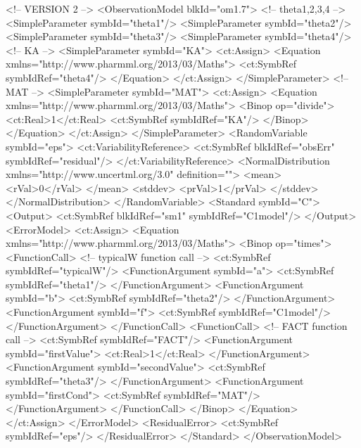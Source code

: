 \documentclass[a4paper,10pt]{article}
\begin{document}
\begin{xmlcode}
<!-- VERSION 2 -->
<ObservationModel blkId="om1.7">
    <!-- theta1,2,3,4 -->
    <SimpleParameter symbId="theta1"/>
    <SimpleParameter symbId="theta2"/>
    <SimpleParameter symbId="theta3"/>
    <SimpleParameter symbId="theta4"/>
    <!-- KA -->
    <SimpleParameter symbId="KA">
        <ct:Assign>
            <Equation xmlns="http://www.pharmml.org/2013/03/Maths">
                <ct:SymbRef symbIdRef="theta4"/>
            </Equation>
        </ct:Assign>
    </SimpleParameter>
    <!-- MAT -->
    <SimpleParameter symbId="MAT">
        <ct:Assign>
            <Equation xmlns="http://www.pharmml.org/2013/03/Maths">
                <Binop op="divide">
                    <ct:Real>1</ct:Real>
                    <ct:SymbRef symbIdRef="KA"/>
                </Binop>
            </Equation>
        </ct:Assign>
    </SimpleParameter>
    <RandomVariable symbId="eps">
        <ct:VariabilityReference>
            <ct:SymbRef blkIdRef="obsErr" symbIdRef="residual"/>
        </ct:VariabilityReference>
        <NormalDistribution xmlns="http://www.uncertml.org/3.0" definition="">
            <mean>
                <rVal>0</rVal>
            </mean>
            <stddev>
                <prVal>1</prVal>
            </stddev>
        </NormalDistribution>
    </RandomVariable>
    <Standard symbId="C">
        <Output>
            <ct:SymbRef blkIdRef="sm1" symbIdRef="C1model"/>
        </Output>
        <ErrorModel>
            <ct:Assign>
                <Equation xmlns="http://www.pharmml.org/2013/03/Maths">
                    <Binop op="times">
                        <FunctionCall>				<!-- typicalW function call -->
                            <ct:SymbRef symbIdRef="typicalW"/>
                            <FunctionArgument symbId="a">
                                <ct:SymbRef symbIdRef="theta1"/>
                            </FunctionArgument>
                            <FunctionArgument symbId="b">
                                <ct:SymbRef symbIdRef="theta2"/>
                            </FunctionArgument>
                            <FunctionArgument symbId="f">
                                <ct:SymbRef symbIdRef="C1model"/>
                            </FunctionArgument>
                        </FunctionCall>
                        <FunctionCall>				<!-- FACT function call -->
                            <ct:SymbRef symbIdRef="FACT"/>
                            <FunctionArgument symbId="firstValue">
                                <ct:Real>1</ct:Real>
                            </FunctionArgument>
                            <FunctionArgument symbId="secondValue">
                                <ct:SymbRef symbIdRef="theta3"/>
                            </FunctionArgument>
                            <FunctionArgument symbId="firstCond">
                                <ct:SymbRef symbIdRef="MAT"/>
                            </FunctionArgument>
                        </FunctionCall>
                    </Binop>
                </Equation>
            </ct:Assign>
        </ErrorModel>
        <ResidualError>
            <ct:SymbRef symbIdRef="eps"/>
        </ResidualError>
    </Standard>
</ObservationModel>
\end{xmlcode}
\end{document}
